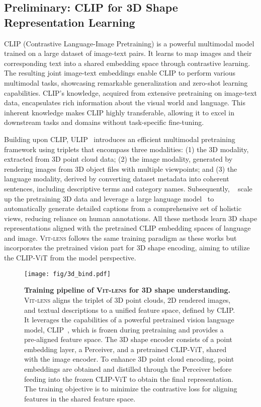 \documentclass{article}
\newcommand{\clipvit}{CLIP-ViT\xspace}
\newcommand{\methodname}{{\scshape Vit-lens}\xspace}
\begin{document}
\subsection{Preliminary: CLIP for 3D Shape Representation Learning}
CLIP (Contrastive Language-Image Pretraining) is a powerful multimodal model trained on a large dataset of image-text pairs. It learns to map images and their corresponding text into a shared embedding space through contrastive learning. 
The resulting joint image-text embeddings enable CLIP to perform various multimodal tasks, showcasing remarkable generalization and zero-shot learning capabilities. 
CLIP's knowledge, acquired from extensive pretraining on image-text data, encapsulates rich information about the visual world and language. This inherent knowledge makes CLIP highly transferable, allowing it to excel in downstream tasks and domains without task-specific fine-tuning. 

Building upon CLIP, ULIP~\cite{xue2023ulip} introduces an efficient multimodal pretraining framework using triplets that encompass three modalities: (1) the 3D modality, extracted from 3D point cloud data; (2) the image modality, generated by rendering images from 3D object files with multiple viewpoints; and (3) the language modality, derived by converting dataset metadata into coherent sentences, including descriptive terms and category names.  
Subsequently, ~\cite{xue2023ulip2,liu2023openshape} scale up the pretraining 3D data and leverage a large language model~\cite{blip,blip2,openai2023gpt4} to automatically generate detailed captions from a comprehensive set of  holistic views, reducing reliance on human annotations. All these methods learn 3D shape representations aligned with the pretrained CLIP embedding spaces of language and image.
\methodname follows the same training paradigm as these works but incorporates the pretrained vision part for 3D shape encoding, aiming to utilize the \clipvit from the model perspective.

\begin{figure}[th]
  \centering
  \texttt{[image: fig/3d\_bind.pdf]}
  \caption{\textbf{Training pipeline of \methodname for 3D shape understanding.} \methodname aligns the triplet of 3D point clouds, 2D rendered images, and textual descriptions to a unified feature space, defined by CLIP.
It leverages the capabilities of a powerful pretrained vision language model, CLIP~\cite{openai_clip,cherti2022openclip}, which is frozen during pretraining and provides a pre-aligned feature space. 
  The 3D shape encoder consists of a point embedding layer, a Perceiver, and a pretrained \clipvit, shared with the image encoder. To enhance 3D point cloud encoding, point embeddings are obtained and distilled through the Perceiver before feeding into the frozen \clipvit to obtain the final representation.
The training objective is to minimize the contrastive loss for aligning features in the shared feature space.}
  \label{fig:3d-arch}
\end{figure}
\end{document}
